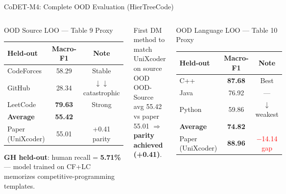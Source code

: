 \documentclass[aspectratio=169, 10pt]{beamer}
\begin{document}
\begin{frame}{CoDET-M4: Complete OOD Evaluation (HierTreeCode)}
\vspace{-0.2cm}
\begin{columns}[T]
\begin{block}{OOD Source LOO --- Table 9 Proxy}
\centering\footnotesize
\begin{tabular}{lcc}
\toprule
\textbf{Held-out} & \textbf{Macro-F1} & \textbf{Note} \\
\midrule
CodeForces & 58.29 & Stable \\
\alert{GitHub} & \alert{28.34} & $\downarrow\downarrow$ catastrophic \\
LeetCode & \textbf{79.63} & Strong \\
\midrule
\textbf{Average} & \textbf{55.42} & \\
\rowcolor{oursgreen}
Paper (UniXcoder) & 55.01 & \textcolor{softgreen}{+0.41 parity} \\
\bottomrule
\end{tabular}

\vspace{3pt}
{\scriptsize \textbf{GH held-out}: human recall = \textbf{5.71\%} --- model trained on CF+LC memorizes competitive-programming templates.}
\end{block}

\begin{exampleblock}{\scriptsize {} First DM method to match UniXcoder on source OOD}
\scriptsize
OOD-Source avg 55.42 vs paper 55.01 $\Rightarrow$ \textbf{parity achieved (+0.41)}.
\end{exampleblock}

\begin{block}{OOD Language LOO --- Table 10 Proxy}
\centering\footnotesize
\begin{tabular}{lcc}
\toprule
\textbf{Held-out} & \textbf{Macro-F1} & \textbf{Note} \\
\midrule
C++ & \textbf{87.68} & Best \\
Java & 76.92 & --- \\
\alert{Python} & \alert{59.86} & $\downarrow$ weakest \\
\midrule
\textbf{Average} & \textbf{74.82} & \\
\rowcolor{accentred!10}
Paper (UniXcoder) & \textbf{88.96} & \textcolor{red}{$-$14.14 gap} \\
\bottomrule
\end{tabular}
\end{block}


\end{columns}
\end{frame}
\end{document}
